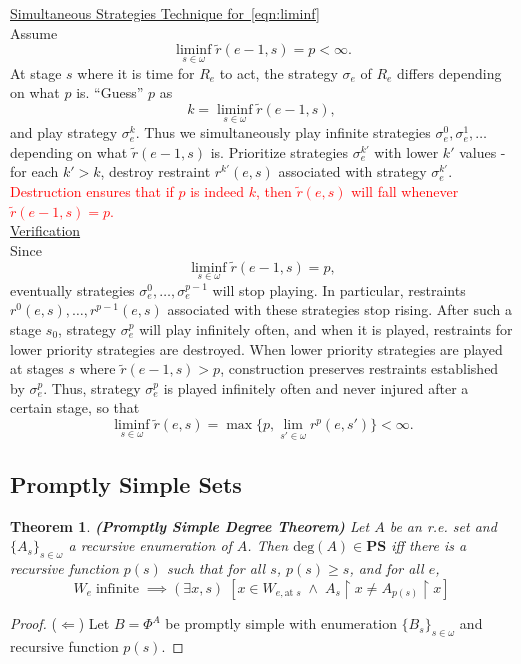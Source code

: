 \documentclass{article}
\newcommand{\COMMENT}[1]{\textcolor{red}{#1}}
\newtheorem{theorem}{Theorem}[subsection]
\begin{document}
  \underline{Simultaneous Strategies Technique for~\eqref{eqn:liminf}}\\
  Assume
  \[\liminf_{s\in\omega} \tilde{r}(e-1,s) =p<\infty.\]
  At stage $s$ where it is time for $R_e$ to act, the strategy $\sigma_e$
  of $R_e$ differs depending on what $p$ is. ``Guess'' $p$
  as
  \[k=\liminf_{s\in\omega} \tilde{r}(e-1,s),\]
  and play strategy $\sigma_e^k$. Thus we simultaneously play 
  infinite strategies $\sigma_e^0,\sigma_e^1,\ldots$ depending on what
  $\tilde{r}(e-1,s)$ is. Prioritize strategies $\sigma_e^{k'}$
  with lower $k'$ values - for each $k'>k$, destroy restraint
  $r^{k'}(e,s)$ associated with strategy $\sigma_e^{k'}$.
  \COMMENT{Destruction ensures that if $p$ is indeed $k$, then
  $\tilde{r}(e,s)$ will fall whenever $\tilde{r}(e-1,s)=p$.}\\

  \underline{Verification}\\
  Since 
  \[\liminf_{s\in\omega} \tilde{r}(e-1,s) =p,\]
  eventually strategies $\sigma_e^0,\ldots,\sigma_e^{p-1}$ will
  stop playing. In particular, restraints
  $r^0(e,s),\ldots,r^{p-1}(e,s)$ associated with these strategies
  stop rising. After such a stage $s_0$, strategy $\sigma_e^{p}$ will
  play infinitely often, and when it is played, restraints for lower
  priority strategies are destroyed. When lower priority strategies are
  played at stages $s$ where $\tilde{r}(e-1,s)>p$, construction
  preserves restraints established by $\sigma_e^{p}$. Thus,
  strategy $\sigma_e^{p}$ is played infinitely often and never
  injured after a certain stage, so that
  \[\liminf_{s\in\omega} \tilde{r}(e,s) =\max\{p,
  \lim_{s'\in\omega} r^{p}(e,s')\} <\infty.\]

\subsection{Promptly Simple Sets}
  \begin{theorem}
    \textbf{(Promptly Simple Degree Theorem)} Let $A$ be an r.e. set and
    $\{A_s\}_{s\in\omega}$ a recursive enumeration of $A$. Then
    $\text{deg}(A) \in\bm{PS}$ iff there is a recursive function $p(s)$ such
    that for all $s$, $p(s)\geq s$, and for all $e$,
    \begin{equation}
      W_e\; \text{infinite}\; \implies (\exists x,s)\; [x\in
      W_{e,\text{at}\; s}\; \wedge\; A_s\restriction x \neq
      A_{p(s)}\restriction x]
      \label{eqn:promptly-permit}
    \end{equation}
  \end{theorem}
  \begin{proof}
    ($\Leftarrow$) Let $B=\Phi^A$ be promptly simple with enumeration
    $\{B_s\}_{s\in\omega}$ and recursive function $p(s)$.
  \end{proof}
\end{document}
